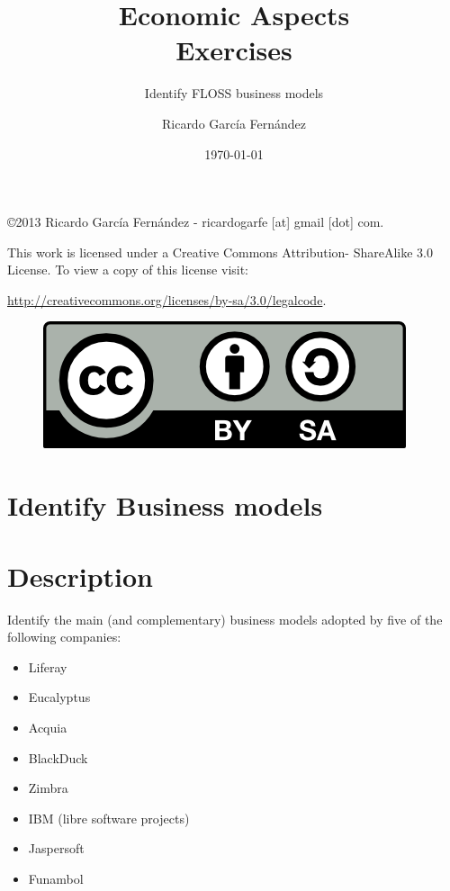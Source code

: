 \documentclass[11pt]{scrartcl}
\title{\textbf{Economic Aspects\\
                Exercises}}
\subtitle{Identify FLOSS business models}
\author{Ricardo Garc\'ia Fern\'andez}
\date{\today}
\begin{document}
\maketitle

\vfill

\begin{flushright}
    \copyright  2013 Ricardo Garc\'ia Fern\'andez - ricardogarfe [at] gmail [dot] com.

    This work is licensed under a Creative Commons Attribution- ShareAlike 3.0 License.
    To view a copy of this license visit:
 
    \url{http://creativecommons.org/licenses/by-sa/3.0/legalcode}.
\end{flushright}

\begin{figure}[h]
    \begin{flushright}	
        \includegraphics{by-sa}
        \label{fig:by-sa}
    \end{flushright}
\end{figure}

\newpage

\section{Identify Business models}

\section{Description}

\par Identify the main (and complementary) business models adopted by five of the following companies:

\begin{itemize}
  \item Liferay
  \item Eucalyptus
  \item Acquia
  \item BlackDuck
  \item Zimbra
  \item IBM (libre software projects)
  \item Jaspersoft
  \item Funambol
\end{itemize}
\end{document}
